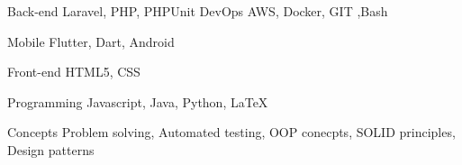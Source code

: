 

\begin{cvskills}

  \cvskill
    {Back-end} %
    {Laravel, PHP, PHPUnit} %
  \cvskill
    {DevOps} %
    {AWS, Docker, GIT ,Bash} %

  \cvskill
    {Mobile} %
    {Flutter, Dart, Android} %

  \cvskill
    {Front-end} %
    {HTML5, CSS} %

  \cvskill
    {Programming} %
    {Javascript, Java, Python, LaTeX} %

  \cvskill
    {Concepts} %
    {Problem solving, Automated testing, OOP conecpts, SOLID principles, Design patterns} %

\end{cvskills}
